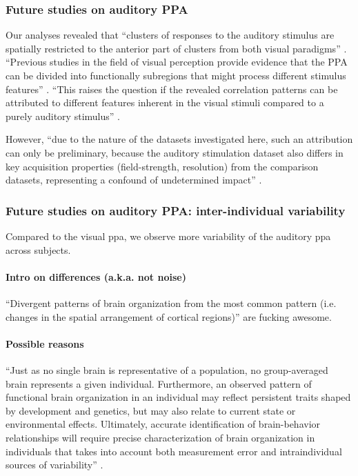 \subsubsection{Future studies on auditory PPA}
%
Our analyses revealed that ``clusters of responses to the auditory stimulus are
spatially restricted to the anterior part of clusters from both visual
paradigms'' \citep{haeusler2022processing}.
%
``Previous studies in the field of visual perception provide evidence that the
PPA can be divided into functionally subregions that might process different
stimulus features'' \citep{haeusler2022processing}.
%
``This raises the question if the revealed correlation patterns can be attributed
to different features inherent in the visual stimuli compared to a purely
auditory stimulus'' \citep{haeusler2022processing}.

%
However, ``due to the nature of the datasets investigated here, such an
attribution can only be preliminary, because the auditory stimulation dataset
also differs in key acquisition properties (field-strength, resolution) from the
comparison datasets, representing a confound of undetermined impact''
\citep{haeusler2022processing}.




\subsubsection{Future studies on auditory PPA: inter-individual variability}

%
Compared to the visual \ac{ppa}, we observe more variability of the auditory
\ac{ppa} across subjects.


\paragraph{Intro on differences (a.k.a. not noise)}

%
``Divergent patterns of brain organization from the most common pattern (i.e.
changes in the spatial arrangement of cortical regions)''  \citep{eickhoff2018imaging} are fucking awesome.



\paragraph{Possible reasons}

%
``Just as no single brain is representative of a population, no group-averaged
brain represents a given individual.
%
Furthermore, an observed pattern of functional brain organization in an
individual may reflect persistent traits shaped by development and genetics, but
may also relate to current state or environmental effects.
%
Ultimately, accurate identification of brain-behavior relationships will require
precise characterization of brain organization in individuals that takes into
account both measurement error and intraindividual sources of variability''
\citep{laumann2015functional}.


